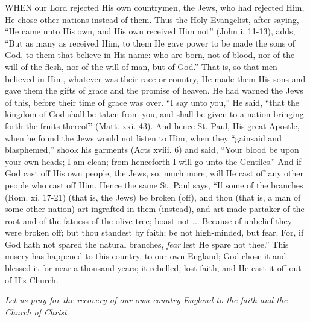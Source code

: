 WHEN our Lord
rejected His own countrymen, the Jews, who had rejected Him, He chose
other nations instead of them. Thus the Holy Evangelist, after saying, ``He
came unto His own, and His own received Him not'' (John i. 11-13), adds, ``But
as many as received Him, to them He gave power to be made the sons of
God, to them that believe in His name: who are born, not of blood, nor
of the will of the flesh, nor of the will of man, but of God.'' That is,
so that men believed in Him, whatever was their race or country, He made
them His sons and gave them the gifts of grace and the promise of
heaven. He had warned the Jews of this, before their time of grace was
over. ``I say unto you,'' He said, ``that the kingdom of God shall be taken
from you, and shall be given to a nation bringing forth the fruits
thereof'' (Matt. xxi. 43). And hence St. Paul, His great Apostle, when he
found the Jews would not listen to Him, when they ``gainsaid and
blasphemed,'' shook his garments (Acts xviii. 6) and said, ``Your blood be
upon your own heads; I am clean; from henceforth I will go unto the
Gentiles.'' And if God cast off His own people, the Jews, so, much more,
will He cast off any other people who cast off Him. Hence the same St.
Paul says, ``If some of the branches (Rom. xi. 17-21) (that is, the
Jews) be broken (off), and thou (that is, a man of some other nation)
art ingrafted in them (instead), and art made partaker of the root and
of the fatness of the olive tree; boast not ... Because of unbelief they
were broken off; but thou standest by faith; be not high-minded, but
fear. For, if God hath not spared the natural branches, \emph{fear} lest
He spare not thee.'' This misery has happened to this country, to our own
England; God chose it and blessed it for near a thousand years; it
rebelled, lost faith, and He cast it off out of His Church.

\emph{Let us pray for the recovery
of our own country England to the faith and the Church of Christ}.

